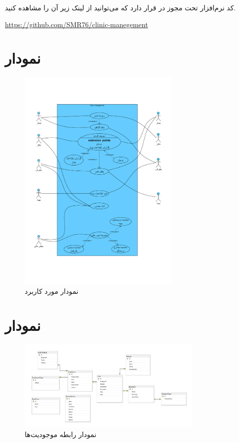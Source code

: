 \documentclass[a4paper,12pt]{report}
\begin{document}
	کد نرم‌افزار تحت مجوز 
	\hyperref{https://www.gnu.org/licenses/lgpl-3.0.en.html}{}{}{}
	در 
	قرار دارد که می‌توانید از لینک زیر آن را مشاهده کنید. 
	
	{
		\LTR
		\url{https://github.com/SMR76/clinic-manegement}
	}
	\pagebreak
	\section{
		نمودار 
	}\label{sec1:chap2}
	\vspace{-2cm}
	\begin{figure}[!h]
		\label{fig1:sec1:chap2}
		\begin{center}
			\includegraphics[width=0.7\textwidth]{diagrams/useCase.pdf}
			\caption{نمودار مورد کاربرد}
		\end{center}
	\end{figure}

	\pagebreak
	\section{
		نمودار 
		}\label{sec2:chap2}
	\begin{figure}[!h]
		\label{fig1:sec2:chap2}
		\begin{center}
			\includegraphics[width=0.8\textwidth]{diagrams/ERD.pdf}
			\caption{نمودار رابطه موجودیت‌ها}
		\end{center}
	\end{figure}
\end{document}
